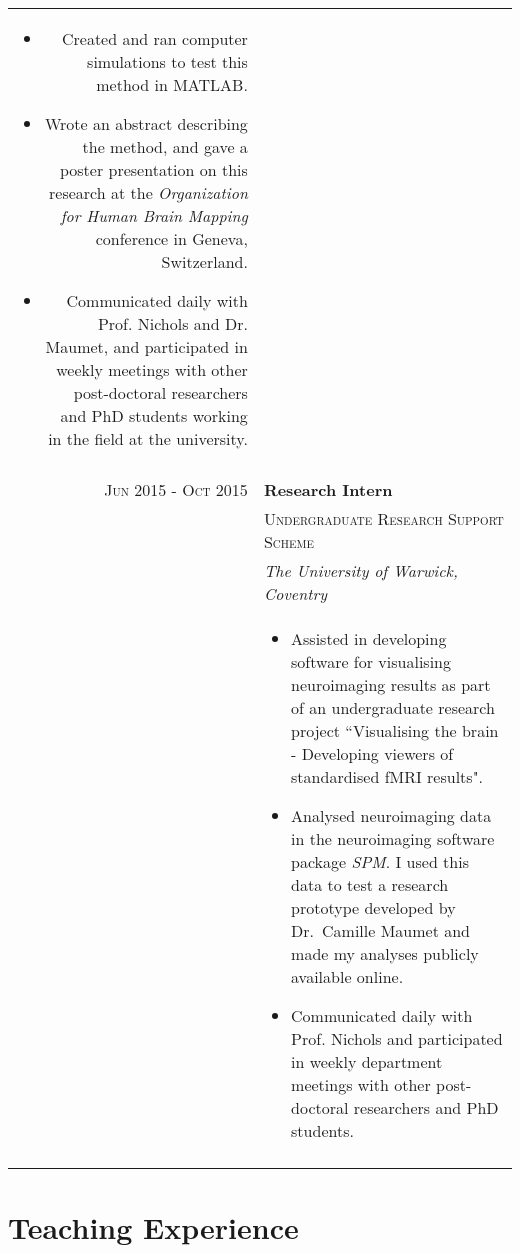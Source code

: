 \documentclass[a4paper,10pt]{article}
\begin{document}
\begin{longtable}{rl}
\begin{minipage}[t]{0.8\textwidth}
\begin{itemize}[leftmargin=*]
 \item Created and ran computer simulations to test this method in MATLAB. 
 \item Wrote an abstract describing the method, and gave a poster presentation on this research at the \textit{Organization for Human Brain Mapping} conference in Geneva, Switzerland.  
 \item Communicated daily with Prof. Nichols and Dr. Maumet, and participated in weekly meetings with other post-doctoral researchers and PhD students working in the field at the university. 
\fi
  \end{itemize}
 \end{minipage} \\&\\
 
\textsc{Jun} 2015 - \textsc{Oct} 2015
& \large{\textbf{Research Intern}}\\
& \textsc{Undergraduate Research Support Scheme}\\
& \textit{The University of Warwick, Coventry} \\
&\begin{minipage}[t]{0.8\textwidth}
 \begin{itemize}[leftmargin=*]
 \item Assisted in developing software for visualising neuroimaging results as part of an undergraduate research project ``Visualising the brain - Developing viewers of standardised fMRI results".
 \item Analysed neuroimaging data in the neuroimaging software package \textit{SPM}. I used this data to test a research prototype developed by Dr.\ Camille Maumet and made my analyses publicly available online.  
 \item Communicated daily with Prof. Nichols and participated in weekly department meetings with other post-doctoral researchers and PhD students.
\end{itemize}
\end{minipage}\\&\\
\end{longtable}

\section{Teaching Experience}
\end{document}
